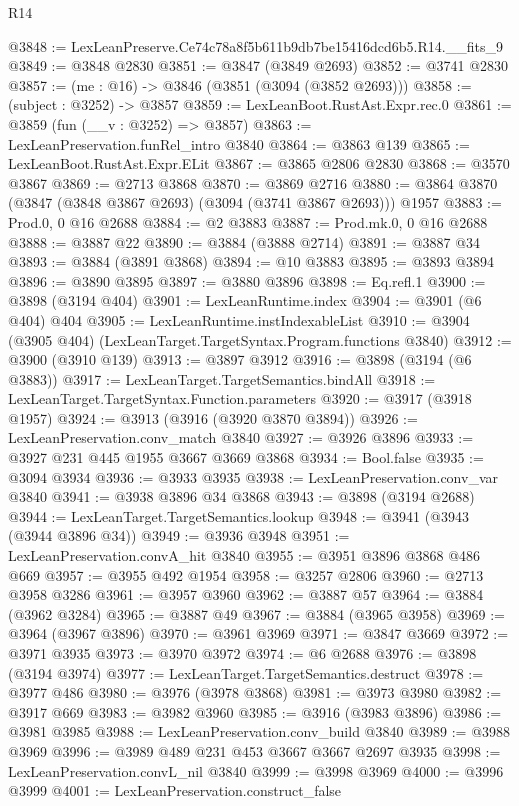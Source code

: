 \begin{lexlean}{R14}
\begin{coremodule}
@3848 := LexLeanPreserve.Ce74c78a8f5b611b9db7be15416dcd6b5.R14.__fits_9
@3849 := @3848 @2830
@3851 := @3847 (@3849 @2693)
@3852 := @3741 @2830
@3857 := (me : @16) -> @3846 (@3851 (@3094 (@3852 @2693)))
@3858 := (subject : @3252) -> @3857
@3859 := LexLeanBoot.RustAst.Expr.rec.{0}
@3861 := @3859 (fun (__v : @3252) => @3857)
@3863 := LexLeanPreservation.funRel_intro @3840
@3864 := @3863 @139
@3865 := LexLeanBoot.RustAst.Expr.ELit
@3867 := @3865 @2806 @2830
@3868 := @3570 @3867
@3869 := @2713 @3868
@3870 := @3869 @2716
@3880 := @3864 @3870 (@3847 (@3848 @3867 @2693) (@3094 (@3741 @3867 @2693))) @1957
@3883 := Prod.{0, 0} @16 @2688
@3884 := @2 @3883
@3887 := Prod.mk.{0, 0} @16 @2688
@3888 := @3887 @22
@3890 := @3884 (@3888 @2714)
@3891 := @3887 @34
@3893 := @3884 (@3891 @3868)
@3894 := @10 @3883
@3895 := @3893 @3894
@3896 := @3890 @3895
@3897 := @3880 @3896
@3898 := Eq.refl.{1}
@3900 := @3898 (@3194 @404)
@3901 := LexLeanRuntime.index
@3904 := @3901 (@6 @404) @404
@3905 := LexLeanRuntime.instIndexableList
@3910 := @3904 (@3905 @404) (LexLeanTarget.TargetSyntax.Program.functions @3840)
@3912 := @3900 (@3910 @139)
@3913 := @3897 @3912
@3916 := @3898 (@3194 (@6 @3883))
@3917 := LexLeanTarget.TargetSemantics.bindAll
@3918 := LexLeanTarget.TargetSyntax.Function.parameters
@3920 := @3917 (@3918 @1957)
@3924 := @3913 (@3916 (@3920 @3870 @3894))
@3926 := LexLeanPreservation.conv_match @3840
@3927 := @3926 @3896
@3933 := @3927 @231 @445 @1955 @3667 @3669 @3868
@3934 := Bool.false
@3935 := @3094 @3934
@3936 := @3933 @3935
@3938 := LexLeanPreservation.conv_var @3840
@3941 := @3938 @3896 @34 @3868
@3943 := @3898 (@3194 @2688)
@3944 := LexLeanTarget.TargetSemantics.lookup
@3948 := @3941 (@3943 (@3944 @3896 @34))
@3949 := @3936 @3948
@3951 := LexLeanPreservation.convA_hit @3840
@3955 := @3951 @3896 @3868 @486 @669
@3957 := @3955 @492 @1954
@3958 := @3257 @2806
@3960 := @2713 @3958 @3286
@3961 := @3957 @3960
@3962 := @3887 @57
@3964 := @3884 (@3962 @3284)
@3965 := @3887 @49
@3967 := @3884 (@3965 @3958)
@3969 := @3964 (@3967 @3896)
@3970 := @3961 @3969
@3971 := @3847 @3669
@3972 := @3971 @3935
@3973 := @3970 @3972
@3974 := @6 @2688
@3976 := @3898 (@3194 @3974)
@3977 := LexLeanTarget.TargetSemantics.destruct
@3978 := @3977 @486
@3980 := @3976 (@3978 @3868)
@3981 := @3973 @3980
@3982 := @3917 @669
@3983 := @3982 @3960
@3985 := @3916 (@3983 @3896)
@3986 := @3981 @3985
@3988 := LexLeanPreservation.conv_build @3840
@3989 := @3988 @3969
@3996 := @3989 @489 @231 @453 @3667 @3667 @2697 @3935
@3998 := LexLeanPreservation.convL_nil @3840
@3999 := @3998 @3969
@4000 := @3996 @3999
@4001 := LexLeanPreservation.construct_false

\end{coremodule}
\end{lexlean}
